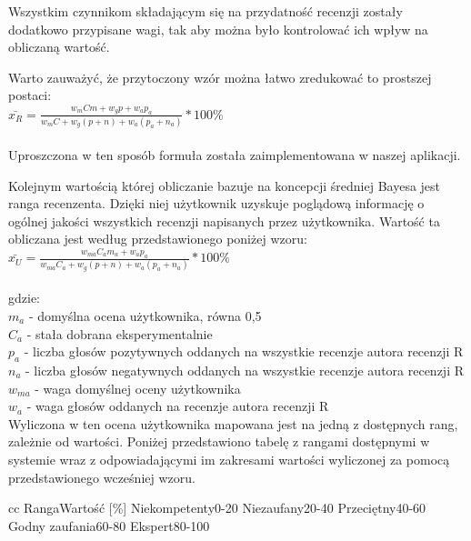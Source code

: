 Wszystkim czynnikom składającym się na przydatność recenzji zostały dodatkowo przypisane wagi, tak aby można było kontrolować ich wpływ na obliczaną wartość.

Warto zauważyć, że przytoczony wzór można łatwo zredukować to prostszej postaci:\\

$\bar{x_{R}}=\frac{w_{m}Cm+w_{g}{p}+w_{a}p_{a}}{w_{m}C+w_{g}(p+n)+w_{a}(p_{a}+n_{a})}*100\%$\\\\

Uproszczona w ten sposób formuła została zaimplementowana w naszej aplikacji.

Kolejnym wartością której obliczanie bazuje na koncepcji średniej Bayesa jest ranga recenzenta. Dzięki niej użytkownik uzyskuje poglądową informację o ogólnej jakości wszystkich recenzji napisanych przez użytkownika. Wartość ta obliczana jest według przedstawionego poniżej wzoru:\\

$\bar{x_{U}}=\frac{w_{ma}C_{a}m_{a}+w_{a}p_{a}}{w_{ma}C_{a}+w_{g}(p+n)+w_{a}(p_{a}+n_{a})}*100\%$\\\\
gdzie:\\
$m_{a}$ - domyślna ocena użytkownika, równa 0,5\\
$C_{a}$ - stała dobrana eksperymentalnie\\
$p_{a}$ - liczba głosów pozytywnych oddanych na wszystkie recenzje autora recenzji R\\
$n_{a}$ - liczba głosów negatywnych oddanych na wszystkie recenzje autora recenzji R\\
$w_{ma}$ - waga domyślnej oceny użytkownika\\
$w_{a}$ - waga głosów oddanych na recenzje autora recenzji R\\

Wyliczona w ten ocena użytkownika mapowana jest na jedną z dostępnych rang, zależnie od wartości. Poniżej przedstawiono tabelę z rangami dostępnymi w systemie wraz z odpowiadającymi im zakresami wartości wyliczonej za pomocą przedstawionego wcześniej wzoru.

\begin{tabular}{cc}
{Ranga}{Wartość [\%]}\cr
{Niekompetenty}{0-20}\cr
{Niezaufany}{20-40}\cr
{Przeciętny}{40-60}\cr
{Godny zaufania}{60-80}\cr
{Ekspert}{80-100}\cr
\end{tabular}
